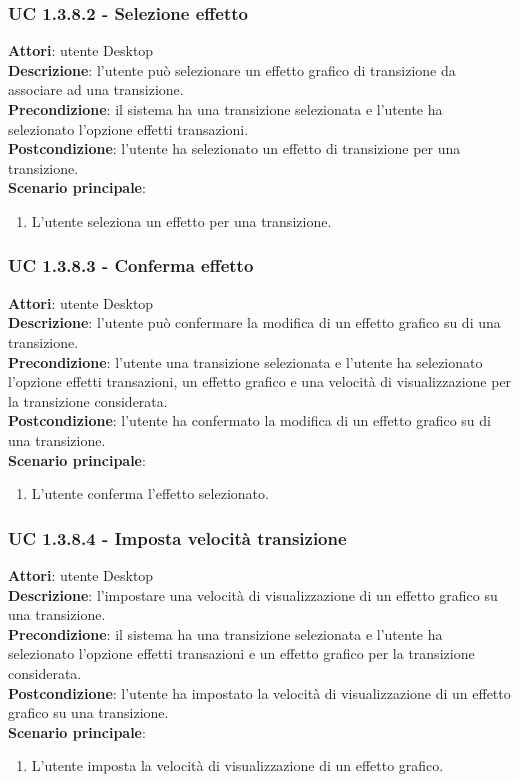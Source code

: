 \subsubsection{UC 1.3.8.2 - Selezione effetto}{
	\label{uc1.3.8.2}
	\textbf{Attori}: utente Desktop \\
	\textbf{Descrizione}: l'utente può selezionare un effetto grafico di transizione da associare ad una transizione. \\
	\textbf{Precondizione}: il sistema ha una transizione selezionata e l'utente ha selezionato l'opzione effetti transazioni.	\\
	\textbf{Postcondizione}: l'utente ha selezionato un effetto di transizione per una transizione.	\\
	\textbf{Scenario principale}:
	\begin{enumerate}
		\item L'utente seleziona un effetto per una transizione.
	\end{enumerate}
}
\subsubsection{UC 1.3.8.3 - Conferma effetto}{
	\label{uc1.3.8.3}
	\textbf{Attori}: utente Desktop \\
	\textbf{Descrizione}: l'utente può confermare la modifica di un effetto grafico su di una transizione. \\
	\textbf{Precondizione}: l'utente una transizione selezionata e l'utente ha selezionato l'opzione effetti transazioni, un effetto grafico e una velocità di visualizzazione per la transizione considerata.	\\
	\textbf{Postcondizione}: l'utente ha confermato la modifica di un effetto grafico su di una transizione.\\
	\textbf{Scenario principale}:
	\begin{enumerate}
		\item L'utente conferma l'effetto selezionato.
	\end{enumerate}
}
\subsubsection{UC 1.3.8.4 - Imposta velocità transizione}{
	\label{uc1.3..8.4}
	\textbf{Attori}: utente Desktop \\
	\textbf{Descrizione}: l'impostare una velocità di visualizzazione di un effetto grafico su una transizione. \\
	\textbf{Precondizione}: il sistema ha una transizione selezionata e l'utente ha selezionato l'opzione effetti transazioni e un effetto grafico per la transizione considerata.	\\
	\textbf{Postcondizione}: l'utente ha impostato la velocità di visualizzazione di un effetto grafico su una transizione.\\
	\textbf{Scenario principale}:
	\begin{enumerate}
		\item L'utente imposta la velocità di visualizzazione di un effetto grafico.
	\end{enumerate}
}
